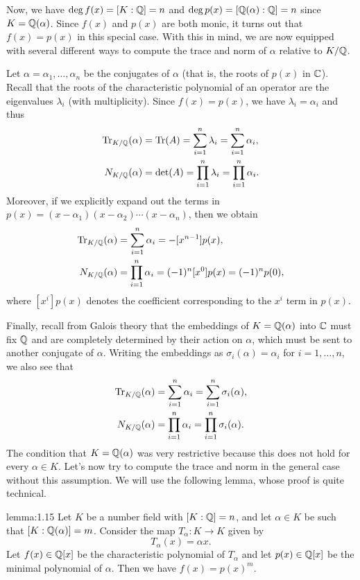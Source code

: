 Now, we have $\deg f(x) = [K : \mathbb{Q}] = n$ and $\deg p(x) = [\mathbb{Q}(\alpha) : 
\mathbb{Q}] = n$ since $K = \mathbb{Q}(\alpha)$. Since $f(x)$ and $p(x)$ are both monic, 
it turns out that $f(x) = p(x)$ in this special case. With this in mind, 
we are now equipped with several different ways to compute the trace and 
norm of $\alpha$ relative to $K/\mathbb{Q}$.

Let $\alpha = \alpha_1, \dots, \alpha_n$ be the conjugates of $\alpha$ 
(that is, the roots of $p(x)$ in $\mathbb{C}$). Recall that the roots of the characteristic 
polynomial of an operator are the eigenvalues $\lambda_i$ (with multiplicity).
Since $f(x) = p(x)$, we have $\lambda_i = \alpha_i$ and thus
\begin{align*}
    \operatorname{Tr}_{K/\mathbb{Q}}(\alpha) &= \operatorname{Tr}(A) = \sum_{i=1}^n \lambda_i = \sum_{i=1}^n \alpha_i, \\ 
    N_{K/\mathbb{Q}}(\alpha) &= \det(A) = \prod_{i=1}^n \lambda_i = \prod_{i=1}^n \alpha_i. 
\end{align*}
Moreover, if we explicitly expand out the terms in $p(x) = (x - \alpha_1)
(x - \alpha_2) \cdots (x - \alpha_n)$, then we obtain 
\begin{align*}
    \operatorname{Tr}_{K/\mathbb{Q}}(\alpha) &= \sum_{i=1}^n \alpha_i = -[x^{n-1}] p(x), \\ 
    N_{K/\mathbb{Q}}(\alpha) &= \prod_{i=1}^n \alpha_i = (-1)^n [x^0] p(x) = 
    (-1)^n p(0),
\end{align*}
where $[x^i] p(x)$ denotes the coefficient corresponding to the $x^i$ term 
in $p(x)$.\newpage

Finally, recall from Galois theory that the embeddings of $K = \mathbb{Q}(\alpha)$ 
into $\mathbb{C}$ must fix $\mathbb{Q}$ and are completely determined by their action on $\alpha$, 
which must be sent to another conjugate of $\alpha$. Writing the embeddings as 
$\sigma_i(\alpha) = \alpha_i$ for $i = 1, \dots, n$, we also see that 
\begin{align*}
    \operatorname{Tr}_{K/\mathbb{Q}}(\alpha) &= \sum_{i=1}^n \alpha_i = \sum_{i=1}^n \sigma_i(\alpha), \\ 
    N_{K/\mathbb{Q}}(\alpha) &= \prod_{i=1}^n \alpha_i = \prod_{i=1}^n \sigma_i(\alpha).
\end{align*}
The condition that $K = \mathbb{Q}(\alpha)$ was very restrictive because 
this does not hold for every $\alpha \in K$. Let's now try 
to compute the trace and norm in the general case without this assumption. 
We will use the following lemma, whose proof is quite technical. 

\begin{lemma}{lemma:1.15}
    Let $K$ be a number field with $[K : \mathbb{Q}] = n$, and let $\alpha \in K$ 
    be such that $[K : \mathbb{Q}(\alpha)] = m$. Consider the map $T_\alpha : 
    K \to K$ given by 
    \[ T_\alpha(x) = \alpha x. \] 
    Let $f(x) \in \mathbb{Q}[x]$ be the 
    characteristic polynomial of $T_\alpha$ and let $p(x) \in \mathbb{Q}[x]$ be the 
    minimal polynomial of $\alpha$. Then we have $f(x) = p(x)^m$. 
\end{lemma}\vspace{-0.25cm}

